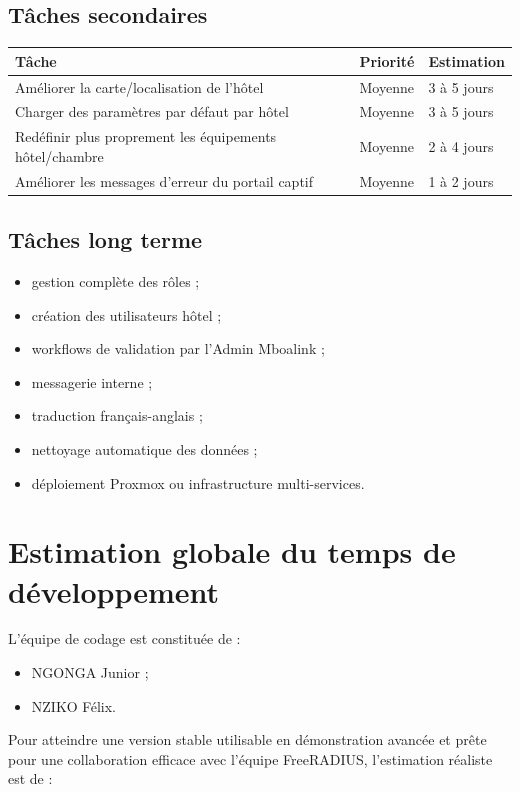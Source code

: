 \documentclass[12pt,a4paper]{article}
\begin{document}
\subsection{Tâches secondaires}

\begin{longtable}{|p{7cm}|p{4cm}|p{3cm}|}
\hline
\textbf{Tâche} & \textbf{Priorité} & \textbf{Estimation} \\
\hline
Améliorer la carte/localisation de l'hôtel & Moyenne & 3 à 5 jours \\
\hline
Charger des paramètres par défaut par hôtel & Moyenne & 3 à 5 jours \\
\hline
Redéfinir plus proprement les équipements hôtel/chambre & Moyenne & 2 à 4 jours \\
\hline
Améliorer les messages d'erreur du portail captif & Moyenne & 1 à 2 jours \\
\hline
\end{longtable}

\subsection{Tâches long terme}

\begin{itemize}
  \item gestion complète des rôles ;
  \item création des utilisateurs hôtel ;
  \item workflows de validation par l'Admin Mboalink ;
  \item messagerie interne ;
  \item traduction français-anglais ;
  \item nettoyage automatique des données ;
  \item déploiement Proxmox ou infrastructure multi-services.
\end{itemize}

\section{Estimation globale du temps de développement}

L'équipe de codage est constituée de :

\begin{itemize}
  \item NGONGA Junior ;
  \item NZIKO Félix.
\end{itemize}

Pour atteindre une version stable utilisable en démonstration avancée et prête pour une collaboration efficace avec l'équipe FreeRADIUS, l'estimation réaliste est de :
\end{document}
